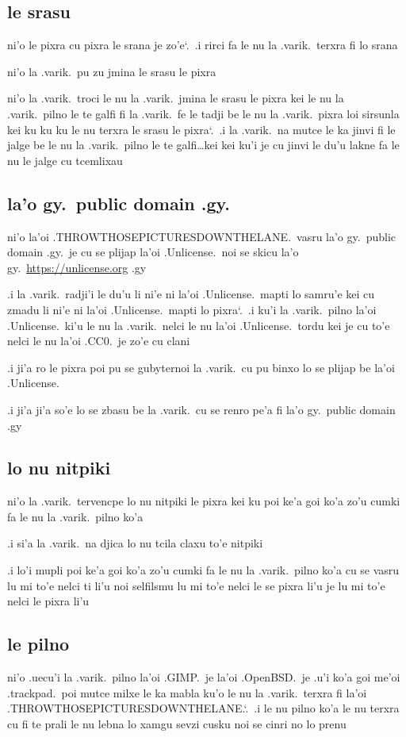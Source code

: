 \documentclass{report}
\newcommand\sds{\spacefactor\sfcode`.\ \space}
\begin{document}
\subsection{le srasu}
ni'o le pixra cu pixra le srana je zo'e\sds  .i rirci fa le nu la .varik.\ terxra fi lo srana

ni'o la .varik.\ pu zu jmina le srasu le pixra

ni'o la .varik.\ troci le nu la .varik.\ jmina le srasu le pixra kei le nu la .varik.\ pilno le te galfi fi la .varik.\ fe le tadji be le nu la .varik.\ pixra loi sirsunla kei ku ku ku le nu terxra le srasu le pixra\sds  .i la .varik.\ na mutce le ka jinvi fi le jalge be le nu la .varik.\ pilno le te galfi\ldots kei kei ku'i je cu jinvi le du'u lakne fa le nu le jalge cu tcemlixau

\subsection{la'o gy.\ public domain .gy.}
ni'o la'oi .THROWTHOSEPICTURESDOWNTHELANE.\ vasru la'o gy.\ public domain .gy.\ je cu se plijap la'oi .Unlicense.\ noi se skicu la'o gy.\ \url{https://unlicense.org} .gy

.i la .varik.\ radji'i le du'u li ni'e ni la'oi .Unlicense.\ mapti lo samru'e kei cu zmadu li ni'e ni la'oi .Unlicense.\ mapti lo pixra\sds  .i ku'i la .varik.\ pilno la'oi .Unlicense.\ ki'u le nu la .varik.\ nelci le nu la'oi .Unlicense.\ tordu kei je cu to'e nelci le nu la'oi .CC0.\ je zo'e cu clani

.i ji'a ro le pixra poi pu se gubyternoi la .varik.\ cu pu binxo lo se plijap be la'oi .Unlicense.

.i ji'a ji'a so'e lo se zbasu be la .varik.\ cu se renro pe'a fi la'o gy.\ public domain .gy

\subsection{lo nu nitpiki}
ni'o la .varik.\ tervencpe lo nu nitpiki le pixra kei ku poi ke'a goi ko'a zo'u cumki fa le nu la .varik.\ pilno ko'a

.i si'a la .varik.\ na djica lo nu tcila claxu to'e nitpiki

.i lo'i mupli poi ke'a goi ko'a zo'u cumki fa le nu la .varik.\ pilno ko'a cu se vasru lu mi to'e nelci ti li'u noi selfilsmu lu mi to'e nelci le se pixra li'u je lu mi to'e nelci le pixra li'u

\subsection{le pilno}
ni'o .uecu'i la .varik.\ pilno la'oi .GIMP.\ je la'oi .OpenBSD.\ je .u'i ko'a goi me'oi .trackpad.\ poi mutce milxe le ka mabla ku'o le nu la .varik.\ terxra fi la'oi .THROWTHOSEPICTURESDOWNTHELANE.\sds  .i le nu pilno ko'a le nu terxra cu fi te prali le nu lebna lo xamgu sevzi cusku noi se cinri no lo prenu
\end{document}

